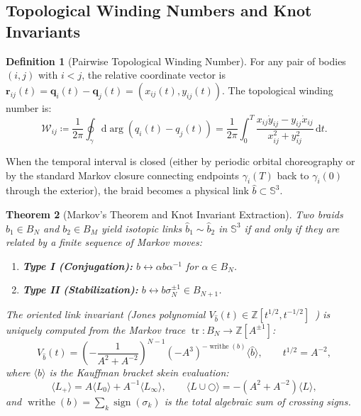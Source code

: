 \documentclass[11pt,a4paper,reqno]{article}
\theoremstyle{plain}
\newtheorem{theorem}{Theorem}[section]
\theoremstyle{definition}
\newtheorem{definition}[theorem]{Definition}
\theoremstyle{remark}
\numberwithin{equation}{section}
\begin{document}
\subsection{Topological Winding Numbers and Knot Invariants}
\begin{definition}[Pairwise Topological Winding Number]
For any pair of bodies $(i, j)$ with $i < j$, the relative coordinate vector is $\bm{r}_{ij}(t) = \bm{q}_i(t) - \bm{q}_j(t) = (x_{ij}(t), y_{ij}(t))$. The topological winding number is:
\begin{equation}
\mathcal{W}_{ij} \coloneqq \frac{1}{2\pi} \oint_{\gamma} \mathrm{d}\arg(q_i(t) - q_j(t)) = \frac{1}{2\pi} \int_0^T \frac{x_{ij} \dot{y}_{ij} - y_{ij} \dot{x}_{ij}}{x_{ij}^2 + y_{ij}^2} \, \mathrm{d}t.
\label{eq:winding_number}
\end{equation}
\end{definition}

When the temporal interval is closed (either by periodic orbital choreography or by the standard Markov closure connecting endpoints $\gamma_i(T)$ back to $\gamma_i(0)$ through the exterior), the braid becomes a physical link $\hat{b} \subset \mathbb{S}^3$.

\begin{theorem}[Markov's Theorem and Knot Invariant Extraction]
Two braids $b_1 \in B_N$ and $b_2 \in B_M$ yield isotopic links $\hat{b}_1 \sim \hat{b}_2$ in $\mathbb{S}^3$ if and only if they are related by a finite sequence of Markov moves:
\begin{enumerate}
    \item \textbf{Type I (Conjugation):} $b \leftrightarrow \alpha b \alpha^{-1}$ for $\alpha \in B_N$.
    \item \textbf{Type II (Stabilization):} $b \leftrightarrow b \sigma_N^{\pm 1} \in B_{N+1}$.
\end{enumerate}
The oriented link invariant (Jones polynomial $V_{\hat{b}}(t) \in \mathbb{Z}[t^{1/2}, t^{-1/2}]$~\cite{Jones1985}) is uniquely computed from the Markov trace $\operatorname{tr}: B_N \to \mathbb{Z}[A^{\pm 1}]$:
\begin{equation}
V_{\hat{b}}(t) = \left( -\frac{1}{A^2 + A^{-2}} \right)^{N-1} (-A^3)^{-\operatorname{writhe}(b)} \langle \hat{b} \rangle, \qquad t^{1/2} = A^{-2},
\label{eq:jones_polynomial}
\end{equation}
where $\langle \hat{b} \rangle$ is the Kauffman bracket skein evaluation:
\begin{equation}
\langle L_+ \rangle = A \langle L_0 \rangle + A^{-1} \langle L_\infty \rangle, \qquad \langle L \cup \bigcirc \rangle = -(A^2 + A^{-2}) \langle L \rangle,
\end{equation}
and $\operatorname{writhe}(b) = \sum_{k} \operatorname{sign}(\sigma_k)$ is the total algebraic sum of crossing signs.
\end{theorem}
\end{document}
